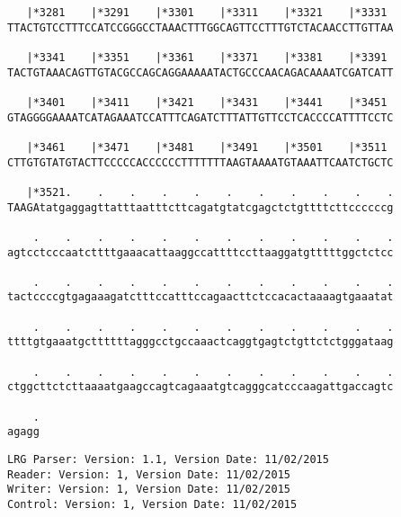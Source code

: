 \documentclass{article}
\begin{document}
\begin{Verbatim}
   |*3281    |*3291    |*3301    |*3311    |*3321    |*3331 
TTACTGTCCTTTCCATCCGGGCCTAAACTTTGGCAGTTCCTTTGTCTACAACCTTGTTAA
  
   |*3341    |*3351    |*3361    |*3371    |*3381    |*3391 
TACTGTAAACAGTTGTACGCCAGCAGGAAAAATACTGCCCAACAGACAAAATCGATCATT
  
   |*3401    |*3411    |*3421    |*3431    |*3441    |*3451 
GTAGGGGAAAATCATAGAAATCCATTTCAGATCTTTATTGTTCCTCACCCCATTTTCCTC
  
   |*3461    |*3471    |*3481    |*3491    |*3501    |*3511 
CTTGTGTATGTACTTCCCCCACCCCCCTTTTTTTAAGTAAAATGTAAATTCAATCTGCTC
  
   |*3521.    .    .    .    .    .    .    .    .    .    .
TAAGAtatgaggagttatttaatttcttcagatgtatcgagctctgttttcttccccccg
  
    .    .    .    .    .    .    .    .    .    .    .    .
agtcctcccaatcttttgaaacattaaggccattttccttaaggatgtttttggctctcc
  
    .    .    .    .    .    .    .    .    .    .    .    .
tactccccgtgagaaagatctttccatttccagaacttctccacactaaaagtgaaatat
  
    .    .    .    .    .    .    .    .    .    .    .    .
ttttgtgaaatgcttttttagggcctgccaaactcaggtgagtctgttctctgggataag
  
    .    .    .    .    .    .    .    .    .    .    .    .
ctggcttctcttaaaatgaagccagtcagaaatgtcagggcatcccaagattgaccagtc
  
    .
agagg
\end{Verbatim}
\newpage
\begin{Verbatim}
LRG Parser: Version: 1.1, Version Date: 11/02/2015
Reader: Version: 1, Version Date: 11/02/2015
Writer: Version: 1, Version Date: 11/02/2015
Control: Version: 1, Version Date: 11/02/2015
\end{Verbatim}
\end{document}
